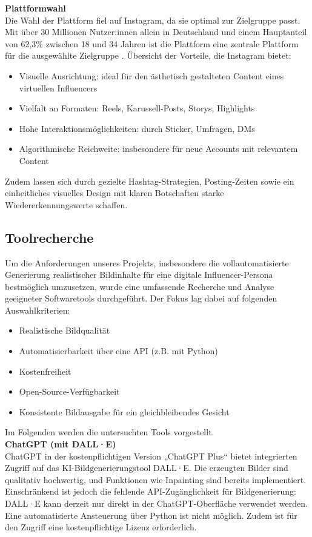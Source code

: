 \documentclass[a4paper,12pt]{article}
\begin{document}
\textbf{Plattformwahl} \\
Die Wahl der Plattform fiel auf Instagram, da sie optimal zur Zielgruppe passt. Mit über 30 Millionen Nutzer:innen allein in Deutschland und einem Hauptanteil von 62,3\% zwischen 18 und 34 Jahren ist die Plattform eine zentrale Plattform für die ausgewählte Zielgruppe .
Übersicht der Vorteile, die Instagram bietet:
\begin{itemize}
    \item Visuelle Ausrichtung: ideal für den ästhetisch gestalteten Content eines virtuellen Influencers
    \item Vielfalt an Formaten: Reels, Karussell-Posts, Storys, Highlights
    \item Hohe Interaktionsmöglichkeiten: durch Sticker, Umfragen, DMs
    \item Algorithmische Reichweite: insbesondere für neue Accounts mit relevantem Content
\end{itemize}
Zudem lassen sich durch gezielte Hashtag-Strategien, Posting-Zeiten sowie ein einheitliches visuelles Design mit klaren Botschaften starke Wiedererkennungswerte schaffen.


\subsection{Toolrecherche}

Um die Anforderungen unseres Projekts, insbesondere die vollautomatisierte Generierung realistischer Bildinhalte für eine digitale Influencer-Persona bestmöglich umzusetzen, wurde eine umfassende Recherche und Analyse geeigneter Softwaretools durchgeführt. Der Fokus lag dabei auf folgenden Auswahlkriterien:
\begin{itemize}
    \item Realistische Bildqualität
    \item Automatisierbarkeit über eine API (z.B. mit Python)
    \item Kostenfreiheit
    \item Open-Source-Verfügbarkeit
    \item Konsistente Bildausgabe für ein gleichbleibendes Gesicht
\end{itemize}

Im Folgenden werden die untersuchten Tools vorgestellt. \\

\textbf{ChatGPT (mit DALL·E)} \\
ChatGPT in der kostenpflichtigen Version „ChatGPT Plus“ bietet integrierten Zugriff auf das KI-Bildgenerierungstool DALL·E. Die erzeugten Bilder sind qualitativ hochwertig, und Funktionen wie Inpainting sind bereits implementiert.
Einschränkend ist jedoch die fehlende API-Zugänglichkeit für Bildgenerierung: DALL·E kann derzeit nur direkt in der ChatGPT-Oberfläche verwendet werden. Eine automatisierte Ansteuerung über Python ist nicht möglich. Zudem ist für den Zugriff eine kostenpflichtige Lizenz erforderlich.
\\
\end{document}
